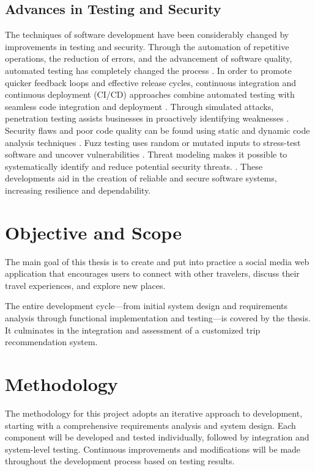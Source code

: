 \subsection{Advances in Testing and Security}
\par The techniques of software development have been considerably changed by improvements in testing and security. Through the automation of repetitive operations, the reduction of errors, and the advancement of software quality, automated testing has completely changed the process \cite{Nguyen2016}. In order to promote quicker feedback loops and effective release cycles, continuous integration and continuous deployment (CI/CD) approaches combine automated testing with seamless code integration and deployment \cite{HumbleFarley2010}. Through simulated attacks, penetration testing assists businesses in proactively identifying weaknesses \cite{Engebretson2013}. Security flaws and poor code quality can be found using static and dynamic code analysis techniques \cite{Spinellis2006}. Fuzz testing uses random or mutated inputs to stress-test software and uncover vulnerabilities \cite{Sutton2007}. Threat modeling makes it possible to systematically identify and reduce potential security threats. \cite{Shostack2014}. These developments aid in the creation of reliable and secure software systems, increasing resilience and dependability.



\section{Objective and Scope}
\par The main goal of this thesis is to create and put into practice a social media web application that encourages users to connect with other travelers, discuss their travel experiences, and explore new places.

The entire development cycle—from initial system design and requirements analysis through functional implementation and testing—is covered by the thesis. It culminates in the integration and assessment of a customized trip recommendation system.

\section{Methodology}
\par The methodology for this project adopts an iterative approach to development, starting with a comprehensive requirements analysis and system design. Each component will be developed and tested individually, followed by integration and system-level testing. Continuous improvements and modifications will be made throughout the development process based on testing results.